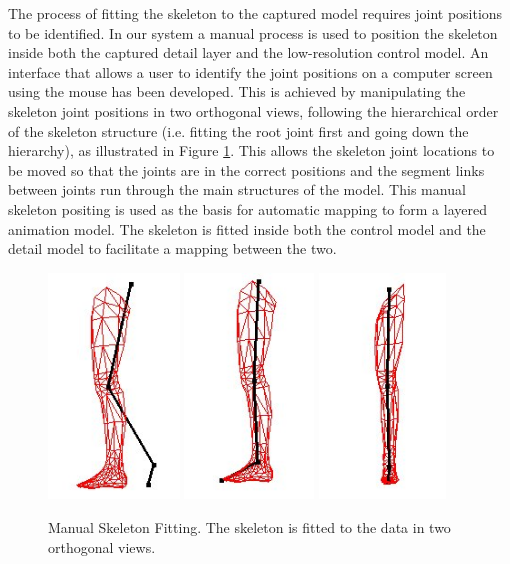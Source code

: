 \documentclass[10pt,oneside,fleqn,a4paper]{book}
\begin{document}
The process of fitting the skeleton to the captured model requires joint positions to be identified. In our system a manual process is used to position the skeleton inside both the captured detail layer and the low-resolution control model. An interface that allows a user to identify the joint positions on a computer screen using the mouse has been developed. This is achieved by manipulating the skeleton joint positions in two orthogonal views, following the hierarchical order of the skeleton structure (i.e. fitting the root joint first and going down the hierarchy), as illustrated in Figure \ref{fig:skeletonfitting}. This allows the skeleton joint locations to be moved so that the joints are in the correct positions and the segment links between joints run through the main structures of the model. This manual skeleton positing is used as the basis for automatic mapping to form a layered animation model. The skeleton is fitted inside both the control model and the detail model to facilitate a mapping between the two.

\begin{figure}
\begin{center}
\includegraphics[height=6cm]{../images/fit1}
\includegraphics[height=6cm]{../images/fit2}
\includegraphics[height=6cm]{../images/fit3}
\caption[Manual Skeleton Fitting]{\label{fig:skeletonfitting} Manual Skeleton Fitting. The skeleton is fitted to the data in two orthogonal views.}
\end{center}
\end{figure}
\end{document}
